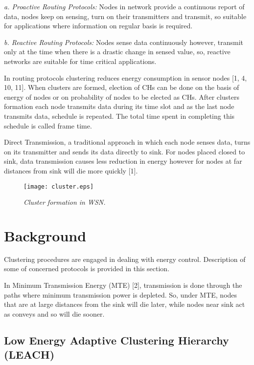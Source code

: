 \documentclass[conference]{IEEEtran}
\begin{document}
\textit{a. Proactive Routing Protocols:}
Nodes in network provide a continuous report of data, nodes keep on sensing, turn on their transmitters and transmit, so suitable for applications where information on regular basis is required.

\textit{b. Reactive Routing Protocols:}
Nodes sense data continuously however, transmit only at the time when there is a drastic change in sensed value, so, reactive networks are suitable for time critical applications.


In routing protocols clustering reduces energy consumption in sensor nodes [1, 4, 10, 11]. When clusters are formed, election of CHs can be done on the basis of energy of nodes or on probability of nodes to be elected as CHs. After clusters formation each node transmits data during its time slot and as the last node transmits data, schedule is repeated. The total time spent in completing this schedule is called frame time.

Direct Transmission, a traditional approach in which each node senses data, turns on its transmitter and sends its data directly to sink. For nodes placed closed to sink, data transmission causes less reduction in energy however for nodes at far distances from sink will die more quickly [1].


\begin{figure}
\begin{center}
\texttt{[image: cluster.eps]}
\caption{\small \sl Cluster formation in WSN.\label{fig:Stupendous}}
\end{center}
\end{figure}

\section{Background}
Clustering procedures are engaged in dealing with energy control. Description of some of concerned protocols is provided in this section.

In Minimum Transmission Energy (MTE) [2], transmission is done through the paths where minimum transmission power is depleted. So, under MTE, nodes that are at large distances from the sink will die later, while nodes near sink act as conveys and so will die sooner.

\subsection {Low Energy Adaptive Clustering Hierarchy (LEACH)}
\end{document}
